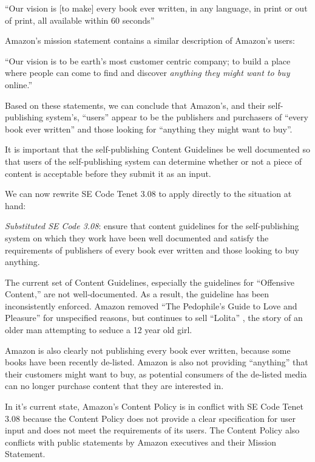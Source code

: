 \documentclass[11pt]{article}
\begin{document}
\begin{multicols}{2}
{``Our vision is [to make] every book ever written, in any language, in print or out of print, all available within 60 seconds'' \cite{LATimesRussQuote}

}

Amazon's mission statement contains a similar description of Amazon's users:

{\addtolength{\leftskip}{6mm}

``Our vision is to be earth's most customer centric company; to build a place where people can come to find and discover \emph{anything they might want to buy} online.'' \cite[Emphasis Mine]{AmazonIRFAQ}

}

Based on these statements, we can conclude that Amazon's, and their self-publishing system's, ``users'' appear to be the publishers and purchasers of ``every book ever written'' and those looking for ``anything they might want to buy''.

It is important that the self-publishing Content Guidelines be well documented so that users of the self-publishing system can determine whether or not a piece of content is acceptable before they submit it as an input.

We can now rewrite SE Code Tenet 3.08 to apply directly to the situation at hand:

\emph{Substituted SE Code 3.08}: ensure that content guidelines for the self-publishing system on which they work have been well documented and satisfy the requirements of publishers of every book ever written and those looking to buy anything.

The current set of Content Guidelines, especially the guidelines for ``Offensive Content,'' are not well-documented.  As a result, the guideline has been inconsistently enforced.  Amazon removed ``The Pedophile's Guide to Love and Pleasure'' for unspecified reasons, but continues to sell ``Lolita'' \cite{AmazonLolitaDTPListing}, the story of an older man attempting to seduce a 12 year old girl. 

Amazon is also clearly not publishing every book ever written, because some books have been recently de-listed.  Amazon is also not providing ``anything'' that their customers might want to buy, as potential consumers of the de-listed media can no longer purchase content that they are interested in.

In it's current state, Amazon's Content Policy is in conflict with SE Code Tenet 3.08 because the Content Policy does not provide a clear specification for user input and does not meet the requirements of its users.  The Content Policy also conflicts with public statements by Amazon executives and their Mission Statement.


\end{multicols}
\end{document}
